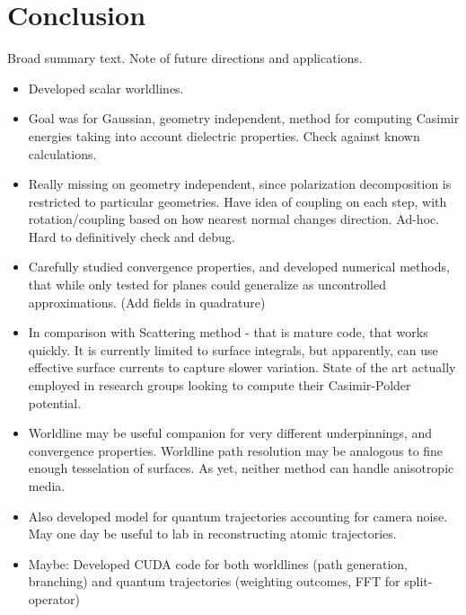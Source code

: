 \chapter{Conclusion}

Broad summary text.  Note of future directions and applications.

\begin{itemize}
  \item Developed scalar worldlines.  
  \item Goal was for Gaussian, geometry independent, method for computing Casimir energies taking
    into account dielectric properties.
    Check against known calculations.
    
  \item Really missing on geometry independent, since polarization decomposition is restricted to
    particular geometries.  Have idea of coupling on each step, with rotation/coupling based on how
    nearest normal changes direction.
    Ad-hoc.  Hard to definitively check and debug.
  \item Carefully studied convergence properties, and developed numerical methods, that while 
    only tested for planes could generalize as uncontrolled approximations.  (Add fields in quadrature)
  \item In comparison with Scattering method - that is mature code, that works quickly.
    It is currently limited to surface integrals, but apparently, can use effective surface currents
    to capture slower variation.  State of the art actually employed in research groups looking to 
    compute their Casimir-Polder potential.
  \item Worldline may be useful companion for very different underpinnings, and convergence properties.
    Worldline path resolution may be analogous to fine enough tesselation of surfaces.  
    As yet, neither method can handle anisotropic media.  
    
  \item Also developed model for quantum trajectories accounting for camera noise.  
    May one day be useful to lab in reconstructing atomic trajectories.

  \item Maybe: 
    Developed CUDA code for both worldlines (path generation, branching) and quantum trajectories
    (weighting outcomes, FFT for split-operator)
\end{itemize}




